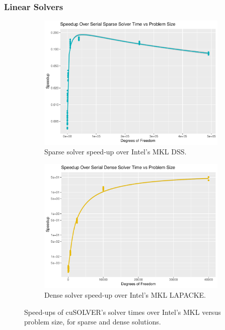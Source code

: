 \subsubsection{Linear Solvers}

\begin{figure}
	\centering
	\begin{subfigure}{0.48\linewidth}
		\centering
		\includegraphics[width = \linewidth]{Plots/solve_sparse_cpu_speedup_vs_n}
		\caption{Sparse solver speed-up over Intel's MKL DSS.}
		\label{fig:sparse_solver}
	\end{subfigure}\hfill
	\begin{subfigure}{0.48\linewidth}
		\centering
		\includegraphics[width=\linewidth]{Plots/solve_dense_cpu_speedup_vs_n}
		\caption{Dense solver speed-up over Intel's MKL LAPACKE.}
		\label{fig:dense_solver}
	\end{subfigure}
	\caption{Speed-ups of cuSOLVER's solver times over Intel's MKL versus problem size, for sparse and dense solutions.}
	\label{fig:solvers}
\end{figure}
